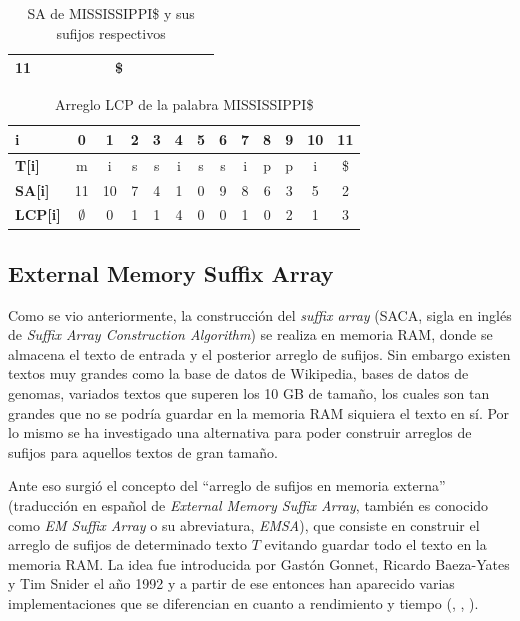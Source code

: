 \begin{table}[h]
\begin{tabular}{|l|l|l|l|l|l|l|l|l|l|l|l|l|}
\textbf{11}                                                      &                         &                         &                        &                        &                        & \$                      &                        &                        &                        &                        &                         &                         \\ \hline
\end{tabular}
\caption{SA de MISSISSIPPI\$ y sus sufijos respectivos}
\end{table}



\begin{table}[h]
\centering
\label{my-label11}
\begin{tabular}{|l|c|c|c|c|c|c|c|c|c|c|c|c|}
\hline
\textbf{i}         & 0  & 1  & 2 & 3 & 4 & 5 & 6 & 7 & 8 & 9 & 10 & 11 \\ \hline
\textbf{T{[}i{]}}  & m  & i  & s & s & i & s & s & i & p & p & i  & \$  \\ \hline
\textbf{SA{[}i{]}} & 11 & 10 & 7 & 4 & 1 & 0 & 9 & 8 & 6 & 3 & 5  & 2  \\ \hline
\textbf{LCP{[}i{]}} & $\emptyset$  & 0  & 1 & 1 & 4 & 0 & 0 & 1 & 0 & 2 & 1  & 3  \\ \hline
\end{tabular}
\caption{Arreglo LCP de la palabra MISSISSIPPI\$}
\end{table}

\subsection{External Memory Suffix Array}

Como se vio anteriormente, la construcción del \textit{suffix array} (SACA, sigla en inglés de \textit{Suffix Array Construction Algorithm}) se realiza en memoria RAM, donde se almacena el texto de entrada y el posterior arreglo de sufijos. Sin embargo existen textos muy grandes como la base de datos de Wikipedia, bases de datos de genomas, variados textos que superen los 10 GB de tamaño, los cuales son tan grandes que no se podría guardar en la memoria RAM siquiera el texto en sí. Por lo mismo se ha investigado una alternativa para poder construir arreglos de sufijos para aquellos textos de gran tamaño.

Ante eso surgió el concepto del ``arreglo de sufijos en memoria externa'' (traducción en español de \textit{External Memory Suffix Array}, también es conocido como \textit{EM Suffix Array} o su abreviatura, \textit{EMSA}), que consiste en construir el arreglo de sufijos de determinado texto $T$ evitando guardar todo el texto en la memoria RAM. La idea fue introducida por Gastón Gonnet, Ricardo Baeza-Yates y Tim Snider el año 1992 \cite{newindices} y a partir de ese entonces han aparecido varias implementaciones que se diferencian en cuanto a rendimiento y tiempo (\cite{better}, \cite{esais}, \cite{sascan}).

